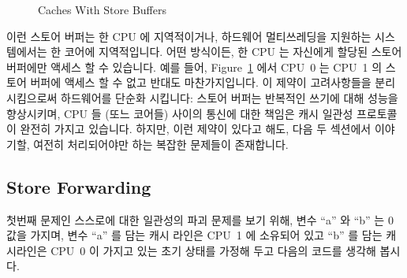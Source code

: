 \begin{figure}[htb]
\begin{center}
\end{center}
\caption{Caches With Store Buffers}
\label{fig:app:whymb:Caches With Store Buffers}
\end{figure}

이런 스토어 버퍼는 한 CPU 에 지역적이거나, 하드웨어 멀티쓰레딩을 지원하는
시스템에서는 한 코어에 지역적입니다.
어떤 방식이든, 한 CPU 는 자신에게 할당된 스토어 버퍼에만 액세스 할 수 있습니다.
예를 들어, Figure~\ref{fig:app:whymb:Caches With Store Buffers} 에서 CPU~0 는
CPU~1 의 스토어 버퍼에 액세스 할 수 없고 반대도 마찬가지입니다.
이 제약이 고려사항들을 분리시킴으로써 하드웨어를 단순화 시킵니다: 스토어 버퍼는
반복적인 쓰기에 대해 성능을 향상시키며, CPU 들 (또느 코어들) 사이의 통신에 대한
책임은 캐시 일관성 프로토콜이 완전히 가지고 있습니다.
하지만, 이런 제약이 있다고 해도, 다음 두 섹션에서 이야기할, 여전히 처리되어야만
하는 복잡한 문제들이 존재합니다.

\subsection{Store Forwarding}
\label{sec:app:whymb:Store Forwarding}

첫번째 문제인 스스로에 대한 일관성의 파괴 문제를 보기 위해, 변수 ``a'' 와 ``b''
는 0 값을 가지며, 변수 ``a'' 를 담는 캐시 라인은 CPU~1 에 소유되어 있고 ``b''
를 담는 캐시라인은 CPU~0 이 가지고 있는 초기 상태를 가정해 두고 다음의 코드를
생각해 봅시다.

